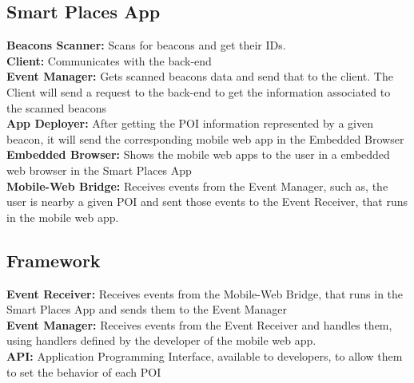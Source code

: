 \subsection{Smart Places App}
\label{sub:smart_places_app}
\textbf{Beacons Scanner:} 
Scans for beacons and get their IDs.
\\
\textbf{Client:} 
Communicates with the back-end
\\
\textbf{Event Manager:} 
Gets scanned beacons data and send that to the client.
The Client will send a request to the back-end to get the
information associated to the scanned beacons
\\
\textbf{App Deployer:} 
After getting the POI information represented by a given beacon,
it will send the corresponding mobile web app in the Embedded
Browser
\\
\textbf{Embedded Browser:} 
Shows the mobile web apps to the user in a embedded web browser
in the Smart Places App
\\
\textbf{Mobile-Web Bridge:} 
Receives events from the Event Manager, such as, the user
is nearby a given POI and sent those events to the Event Receiver,
that runs in the mobile web app.
\\

\subsection{Framework}
\label{sub:framework}
\textbf{Event Receiver:} 
Receives events from the Mobile-Web Bridge,
that runs in the Smart Places App and sends them to the
Event Manager
\\
\textbf{Event Manager:} 
Receives events from the Event Receiver and handles them, using
handlers defined by the developer of the mobile web app.
\\
\textbf{API:} 
Application Programming Interface, available to developers, to 
allow them to set the behavior of each POI
\\
